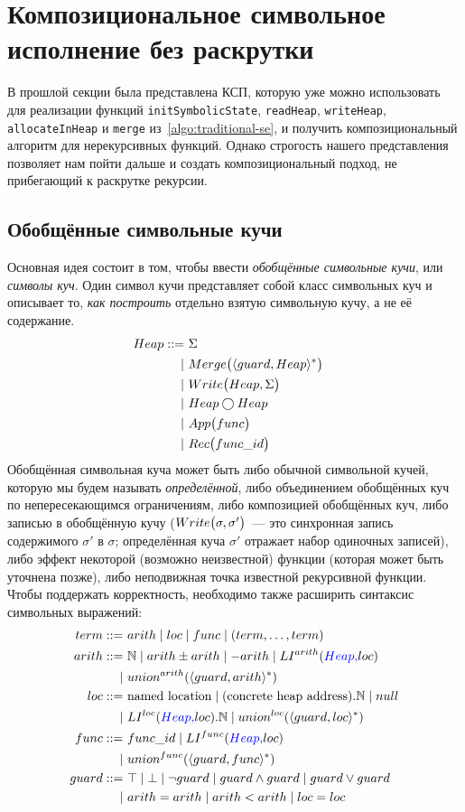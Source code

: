 \section{Композициональное символьное исполнение без раскрутки}
\label{sec:compositional-se}

В прошлой секции была представлена КСП, которую уже можно использовать для реализации функций \texttt{initSymbolicState}, \texttt{readHeap}, \texttt{writeHeap}, \texttt{allocateInHeap} и \texttt{merge} из~\autoref{algo:traditional-se}, и получить композициональный алгоритм для нерекурсивных функций. Однако строгость нашего представления позволяет нам пойти дальше и создать композициональный подход, не прибегающий к раскрутке рекурсии.

\subsection{Обобщённые символьные кучи}
Основная идея состоит в том, чтобы ввести \emph{обобщённые символьные кучи}, или \emph{символы куч}. Один символ кучи представляет собой класс символьных куч и описывает то, \emph{как построить} отдельно взятую символьную кучу, а не её содержание.
%
\begin{align*}
	Heap ::=\,\,&\Sigma \cr
	        \mid\,\,&Merge\big(\langle guard, Heap\rangle^*\big) \cr
	        \mid\,\,&Write\big(Heap,\Sigma\big) \cr
	        \mid\,\,&Heap\bigcirc Heap \cr
	        \mid\,\,&App\big(func\big) \cr
	        \mid\,\,&Rec\big(func\_id\big) \cr
\end{align*}
%
Обобщённая символьная куча может быть либо обычной символьной кучей, которую мы будем называть \emph{определённой}, либо объединением обобщённых куч по непересекающимся ограничениям, либо композицией обобщённых куч, либо записью в обобщённую кучу ($Write\big(\sigma,\sigma'\big)$~--- это синхронная запись содержимого $\sigma'$ в $\sigma$; определённая куча $\sigma'$ отражает набор одиночных записей), либо эффект некоторой (возможно неизвестной) функции (которая может быть уточнена позже), либо неподвижная точка известной рекурсивной функции. Чтобы поддержать корректность, необходимо также расширить синтаксис символьных выражений:
%
\allowdisplaybreaks
\begin{align*}
	term ::=\,\,&arith \mid loc \mid func \mid (term, \ldots, term) \cr
	arith ::=\,\,&\mathbb{N} \mid arith \pm arith \mid -arith \mid LI^{arith}(\textcolor{blue}{Heap,} loc) \\
	\mid\,\,&union^{arith}{(\langle guard, arith\rangle^*)} \cr
	loc ::=\,\,&\text{named location} \mid (\text{concrete heap address}).\mathbb{N} \mid null \\
			   \mid\,\,&LI^{loc}(\textcolor{blue}{Heap,} loc).\mathbb{N} \mid union^{loc}{(\langle guard, loc\rangle^*)} \cr
	func ::=\,\,&func\_id \mid LI^{func}(\textcolor{blue}{Heap,} loc) \\
	            \mid\,\,&union^{func}{(\langle guard, func\rangle^*)} \cr
	guard ::=\,\,&\top \mid \bot \mid \neg guard \mid guard \land guard \mid guard \lor guard \\
				 \mid\,\,&arith = arith \mid arith < arith \mid loc = loc \cr
\end{align*}
